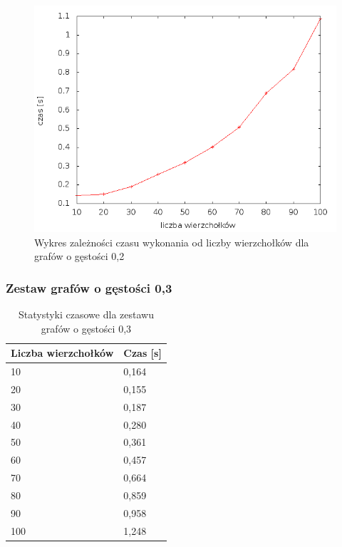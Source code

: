 \documentclass[12pt, a4paper]{article}
\begin{document}
\begin{figure}[h]
    \begin{center}
	\includegraphics[scale=0.5]{results/img/den/den_02.png}
	\caption{Wykres zależności czasu wykonania od liczby wierzchołków dla grafów o gęstości 0,2}
    \end{center}
\end{figure}

\subsubsection*{Zestaw grafów o gęstości 0,3}
\begin{table}[H]
\caption{Statystyki czasowe dla zestawu grafów o gęstości 0,3}
\begin{center}
    \begin{tabular}{|l|l|}
    \hline
    Liczba wierzchołków & Czas [s] \\ \hline
    10 & 0,164 \\ \hline
    20 & 0,155 \\ \hline
    30 & 0,187 \\ \hline
    40 & 0,280 \\ \hline
    50 & 0,361 \\ \hline
    60 & 0,457 \\ \hline
    70 & 0,664 \\ \hline
    80 & 0,859 \\ \hline
    90 & 0,958 \\ \hline
    100 & 1,248 \\ \hline
    \end{tabular}
\end{center}
\end{table}
\end{document}
